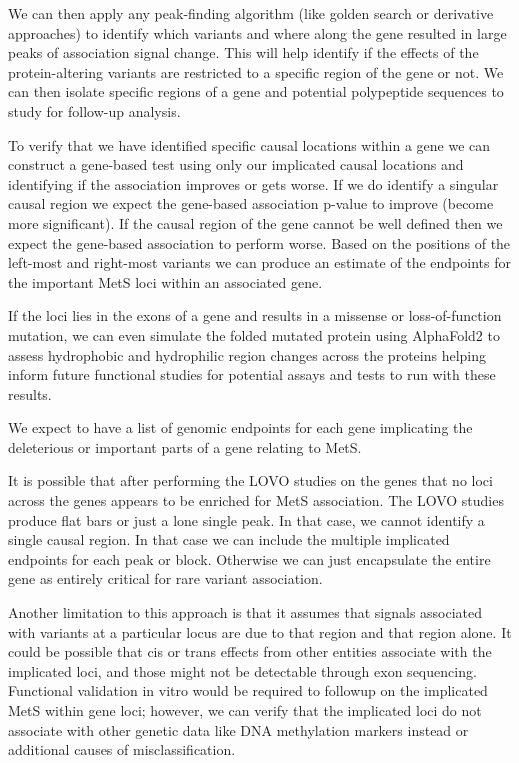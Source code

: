 \documentclass[11pt]{article}
\begin{document}
We can then apply any peak-finding algorithm (like golden search or derivative approaches) to identify which variants and where along the gene resulted in large peaks of association signal change. This will help identify if the effects of the protein-altering variants are restricted to a specific region of the gene or not. We can then isolate specific regions of a gene and potential polypeptide sequences to study for follow-up analysis.

To verify that we have identified specific causal locations within a gene we can construct a gene-based test using only our implicated causal locations and identifying if the association improves or gets worse. If we do identify a singular causal region we expect the gene-based association p-value to improve (become more significant). If the causal region of the gene cannot be well defined then we expect the gene-based association to perform worse. Based on the positions of the left-most and right-most variants we can produce an estimate of the endpoints for the important MetS loci within an associated gene.

If the loci lies in the exons of a gene and results in a missense or loss-of-function mutation, we can even simulate the folded mutated protein using AlphaFold2 to assess hydrophobic and hydrophilic region changes across the proteins helping inform future functional studies for potential assays and tests to run with these results.

We expect to have a list of genomic endpoints for each gene implicating the deleterious or important parts of a gene relating to MetS. 

\noindent {}

It is possible that after performing the LOVO studies on the genes that no loci across the genes appears to be enriched for MetS association. The LOVO studies produce flat bars or just a lone single peak. In that case, we cannot identify a single causal region. In that case we can include the multiple implicated endpoints for each peak or block. Otherwise we can just encapsulate the entire gene as entirely critical for rare variant association.

Another limitation to this approach is that it assumes that signals associated with variants at a particular locus are due to that region and that region alone. It could be possible that cis or trans effects from other entities associate with the implicated loci, and those might not be detectable through exon sequencing. Functional validation in vitro would be required to followup on the implicated MetS within gene loci; however, we can verify that the implicated loci do not associate with other genetic data like DNA methylation markers instead or additional causes of misclassification.
\end{document}
